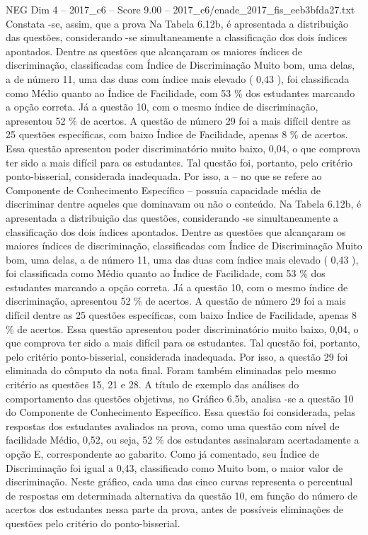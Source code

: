 \begin{textsample}{NEG Dim 4 – 2017\_c6 – Score 9.00 – 2017\_c6/enade\_2017\_fis\_eeb3bfda27.txt}
Constata -se, assim, que a prova Na Tabela 6.12b, é apresentada a distribuição das questões, considerando -se simultaneamente a classificação dos dois índices apontados.
Dentre as questões que alcançaram os maiores índices de discriminação, classificadas com Índice de Discriminação Muito bom, uma delas, a de número 11, uma das duas com índice mais elevado ( 0,43 ), foi classificada como Médio quanto ao Índice de Facilidade, com 53 \% dos estudantes marcando a opção correta.
Já a questão 10, com o mesmo índice de discriminação, apresentou 52 \% de acertos.
A questão de número 29 foi a mais difícil dentre as 25 questões específicas, com baixo Índice de Facilidade, apenas 8 \% de acertos.
Essa questão apresentou poder discriminatório muito baixo, 0,04, o que comprova ter sido a mais difícil para os estudantes.
Tal questão foi, portanto, pelo critério ponto-bisserial, considerada inadequada.
Por isso, a – no que se refere ao Componente de Conhecimento Específico – possuía capacidade média de discriminar dentre aqueles que dominavam ou não o conteúdo.
Na Tabela 6.12b, é apresentada a distribuição das questões, considerando -se simultaneamente a classificação dos dois índices apontados.
Dentre as questões que alcançaram os maiores índices de discriminação, classificadas com Índice de Discriminação Muito bom, uma delas, a de número 11, uma das duas com índice mais elevado ( 0,43 ), foi classificada como Médio quanto ao Índice de Facilidade, com 53 \% dos estudantes marcando a opção correta.
Já a questão 10, com o mesmo índice de discriminação, apresentou 52 \% de acertos.
A questão de número 29 foi a mais difícil dentre as 25 questões específicas, com baixo Índice de Facilidade, apenas 8 \% de acertos.
Essa questão apresentou poder discriminatório muito baixo, 0,04, o que comprova ter sido a mais difícil para os estudantes.
Tal questão foi, portanto, pelo critério ponto-bisserial, considerada inadequada.
Por isso, a questão 29 foi eliminada do cômputo da nota final.
Foram também eliminadas pelo mesmo critério as questões 15, 21 e 28.
A título de exemplo das análises do comportamento das questões objetivas, no Gráfico 6.5b, analisa -se a questão 10 do Componente de Conhecimento Específico.
Essa questão foi considerada, pelas respostas dos estudantes avaliados na prova, como uma questão com nível de facilidade Médio, 0,52, ou seja, 52 \% dos estudantes assinalaram acertadamente a opção E, correspondente ao gabarito.
Como já comentado, seu Índice de Discriminação foi igual a 0,43, classificado como Muito bom, o maior valor de discriminação.
Neste gráfico, cada uma das cinco curvas representa o percentual de respostas em determinada alternativa da questão 10, em função do número de acertos dos estudantes nessa parte da prova, antes de possíveis eliminações de questões pelo critério do ponto-bisserial.

\end{textsample}
